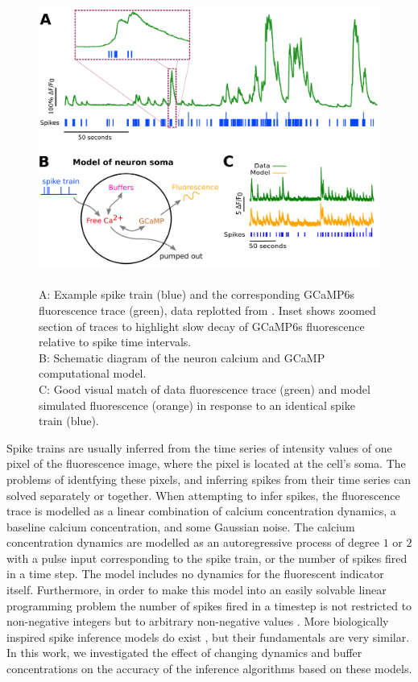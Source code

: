 \begin{figure}[h]
    \centering
    \includegraphics[width=\textwidth]{figures/calcium_chapter/Figure1.png}
  \caption{\\ A: Example spike train (blue) and the corresponding GCaMP6s fluorescence trace (green), data replotted from  \parencite{berens}. Inset shows zoomed section of traces to highlight slow decay of GCaMP6s fluorescence relative to spike time intervals.\\
  B: Schematic diagram of the neuron calcium and GCaMP computational model.\\
  C: Good visual match of data fluorescence trace (green) and model simulated fluorescence (orange) in response to an identical spike train (blue).}
  \label{fig:spike_finder_example}
\end{figure}

Spike trains are usually inferred from the time series of intensity values of one pixel of the fluorescence image, where the pixel is located at the cell's soma. The problems of identfying these pixels, and inferring spikes from their time series can solved separately or together. When attempting to infer spikes, the fluorescence trace is modelled as a linear combination of calcium concentration dynamics, a baseline calcium concentration, and some Gaussian noise. The calcium concentration dynamics are modelled as an autoregressive process of degree $1$ or $2$ with a pulse input corresponding to the spike train, or the number of spikes fired in a time step. The model includes no dynamics for the fluorescent indicator itself. Furthermore, in order to make this model into an easily solvable linear programming problem the number of spikes fired in a timestep is not restricted to non-negative integers but to arbitrary non-negative values \parencite{vogelstein, pnevmatikakis, friedrich, paninski1, paninski2}. More biologically inspired spike inference models do exist \parencite{deneux}, but their fundamentals are very similar. In this work, we investigated the effect of changing dynamics and buffer concentrations on the accuracy of the inference algorithms based on these models.

